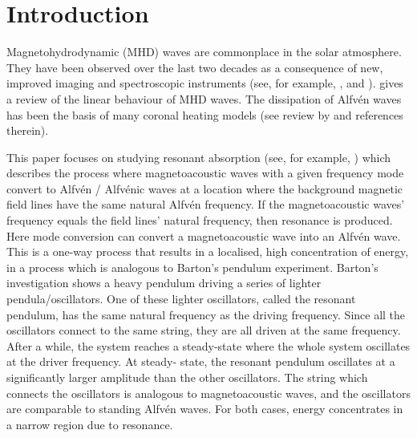 \documentclass[linenumbers]{aastex63}
\begin{document}
\section{Introduction}

Magnetohydrodynamic (MHD) waves are commonplace in the solar atmosphere. They have been observed over the last two decades as a consequence of new, improved imaging and spectroscopic instruments (see, for example, \citet{Tomczyk2007}, \citet{McIntosh2011} and \citet{DeMoortel2012}). \citet{Goossens2011} gives a review of the linear behaviour of MHD waves. The dissipation of Alfv\'en waves has been the basis of many coronal heating models (see review by \citet{Arregui2015} and references therein). 

This paper focuses on studying resonant absorption (see, for example, \citealt{Ionson1982}) which describes the process where magnetoacoustic waves with a given frequency mode convert to Alfv\'en / Alfv\'enic waves at a location where the background magnetic field lines have the same natural Alfv\'en frequency. If the magnetoacoustic waves' frequency equals the field lines' natural frequency, then resonance is produced. Here mode conversion can convert a magnetoacoustic wave into an Alfv\'en wave. This is a one-way process that results in a localised, high concentration of energy, in a process which is analogous to Barton's pendulum experiment. Barton's investigation shows a heavy pendulum driving a series of lighter pendula/oscillators. One of these lighter oscillators, called the resonant pendulum, has the same natural frequency as the driving frequency. Since all the oscillators connect to the same string, they are all driven at the same frequency. After a while, the system reaches a steady-state where the whole system oscillates at the driver frequency. At steady- state, the resonant pendulum oscillates at a significantly larger amplitude than the other oscillators. The string which connects the oscillators is analogous to magnetoacoustic waves, and the oscillators are comparable to standing Alfv\'en waves. For both cases, energy concentrates in a narrow region due to resonance.
\end{document}
